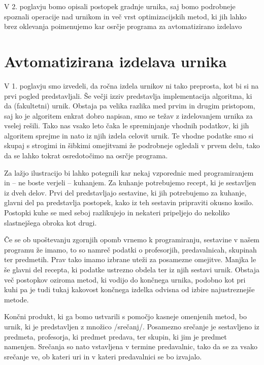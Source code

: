 \documentclass[a4paper,10pt]{article}
\begin{document}
V 2. poglavju bomo opisali postopek gradnje urnika, saj bomo podrobneje spoznali
operacije nad urnikom in več vrst optimizacijskih metod, ki jih lahko brez oklevanja
poimenujemo kar osrčje programa za avtomatizirano izdelavo  %

\section{Avtomatizirana izdelava urnika} %

V 1. poglavju smo izvedeli, da ročna izdela urnikov ni tako preprosta, kot bi si
na prvi pogled predstavljali. Še večji izziv predstavlja implementacija algoritma, ki da
(fakultetni) urnik. Obstaja pa velika razlika med prvim in drugim pristopom, saj ko je
algoritem enkrat dobro napisan, smo se težav z izdelovanjem urnika za vselej rešili.
Tako nas vsako leto čaka le spreminjanje vhodnih podatkov, ki jih algoritem sprejme in
nato iz njih izdela celovit urnik. Te vhodne podatke smo si skupaj s strogimi in šibkimi
omejitvami že podrobneje ogledali v prvem delu, tako da se lahko tokrat osredotočimo na
osrčje programa.

Za lažjo ilustracijo bi lahko potegnili kar nekaj vzporednic med programiranjem in -- ne
boste verjeli -- kuhanjem. Za kuhanje potrebujemo recept, ki je sestavljen iz dveh delov.
Prvi del predstavljajo sestavine, ki jih potrebujemo za kuhanje, glavni del pa predstavlja
postopek, kako iz teh sestavin pripraviti okusno kosilo. Postopki kuhe se med seboj
razlikujejo in nekateri pripeljejo do nekoliko slastnejšega obroka kot drugi.

Če se ob upoštevanju zgornjih opomb vrnemo k programiranju, sestavine v našem programu že
imamo, to so namreč podatki o profesorjih, predavalnicah, skupinah ter predmetih. Prav tako
imamo izbrane uteži za posamezne omejitve. Manjka le še glavni del recepta, ki podatke
ustrezno obdela ter iz njih sestavi urnik. Obstaja več postopkov oziroma metod, ki vodijo
do končnega urnika, podobno kot pri kuhi pa je tudi tukaj kakovost končnega izdelka odvisna
od izbire najustreznejše metode.

Končni produkt, ki ga bomo ustvarili s pomočjo kasneje omenjenih metod, bo urnik, ki je
predstavljen z množico /srečanj/. Posamezno srečanje je sestavljeno iz predmeta,
profesorja, ki predmet predava, ter skupin, ki jim je predmet namenjen. Srečanja so nato
vstavljena v termine predavalnic, tako da se za vsako srečanje ve, ob kateri uri in v
kateri predavalnici se bo izvajalo.
\end{document}
